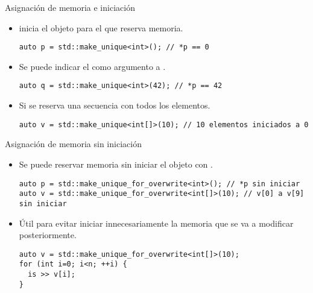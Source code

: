 \begin{frame}[t,fragile]{Asignación de memoria e iniciación}
\begin{itemize}
  \item {} inicia el objeto para el que reserva memoria.
\begin{lstlisting}
auto p = std::make_unique<int>(); // *p == 0
\end{lstlisting}

  \item Se puede indicar el  como argumento a
        .
\begin{lstlisting}
auto q = std::make_unique<int>(42); // *p == 42
\end{lstlisting}

  \item Si se reserva una secuencia con  
         todos los elementos.
\begin{lstlisting}
auto v = std::make_unique<int[]>(10); // 10 elementos iniciados a 0
\end{lstlisting}
\end{itemize}
\end{frame}

\begin{frame}[t,fragile]{Asignación de memoria sin iniciación}
\begin{itemize}
  \item Se puede reservar memoria sin iniciar el objeto con
        .
\begin{lstlisting}
auto p = std::make_unique_for_overwrite<int>(); // *p sin iniciar
auto v = std::make_unique_for_overwrite<int[]>(10); // v[0] a v[9] sin iniciar
\end{lstlisting}

  \item Útil para evitar iniciar innecesariamente la memoria que se va a modificar
        posteriormente.
\begin{lstlisting}
auto v = std::make_unique_for_overwrite<int[]>(10);
for (int i=0; i<n; ++i) {
  is >> v[i];
}
\end{lstlisting}
\end{itemize}
\end{frame}
